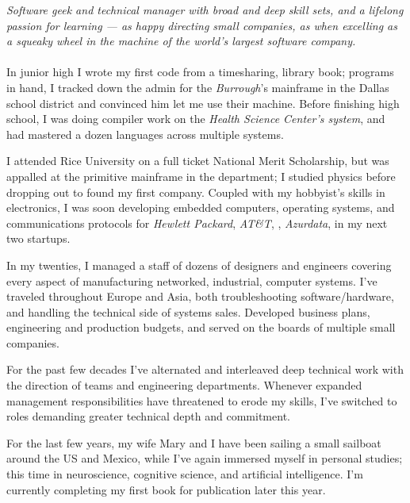 \documentclass[10pt,a4paper]{article}
\begin{document}
\vspace{-1.3em}  %
\begin{multicols}{2}  %
\noindent \emph{Software geek and technical manager with broad and deep skill sets, and a lifelong passion for learning --- as happy directing small companies, as when excelling as a squeaky wheel in the machine of the world's largest software company.}
\\
\\
In junior high I wrote my first code from a \textit{} timesharing, library book; programs in hand, I tracked down the admin for the \textit{Burrough}'s mainframe in the Dallas school district and convinced him let me use their machine. Before finishing high school, I was doing compiler work on the \textit{ Health Science Center's system}, and had mastered a dozen languages across multiple systems.

I attended Rice University on a full ticket National Merit Scholarship, but was appalled at the primitive  mainframe in the  department; I studied physics before dropping out to found my first company. Coupled with my hobbyist's skills in electronics, I was soon developing embedded computers, operating systems, and communications protocols for \textit{Hewlett Packard}, \textit{AT\&T}, \textit{}, \textit{Azurdata}, in my next two startups.

In my twenties, I managed a staff of dozens of designers and engineers covering every aspect of manufacturing networked, industrial, computer systems. I've traveled throughout Europe and Asia, both troubleshooting software/hardware, and handling the technical side of systems sales. Developed business plans, engineering and production budgets, and served on the boards of multiple small companies.

For the past few decades I've alternated and interleaved deep technical work with the direction of teams and engineering departments. Whenever expanded management responsibilities have threatened to erode my skills, I've switched to roles demanding greater technical depth and commitment.

For the last few years, my wife Mary and I have been sailing a small sailboat around the US and Mexico, while I've again immersed myself in personal studies; this time in neuroscience, cognitive science, and artificial intelligence. I'm currently completing my first book for publication later this year.

\end{multicols}
\end{document}
